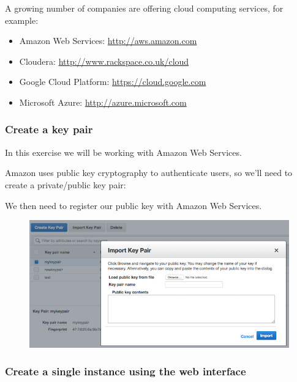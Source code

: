 A growing number of companies are offering cloud computing services, for
example:

\begin{itemize}
\itemsep1pt\parskip0pt
\item
  Amazon Web Services: \url{http://aws.amazon.com}
\item
  Cloudera: \url{http://www.rackspace.co.uk/cloud}
\item
  Google Cloud Platform: \url{https://cloud.google.com}
\item
  Microsoft Azure: \url{http://azure.microsoft.com}
\end{itemize}

\subsubsection{Create a key pair}\label{create-a-key-pair}

In this exercise we will be working with Amazon Web Services.

Amazon uses public key cryptography to authenticate users, so we'll need
to create a private/public key pair:

\begin{Shaded}
\begin{Highlighting}[]
\NormalTok{$ } 
\end{Highlighting}
\end{Shaded}

We then need to register our public key with Amazon Web Services.

\begin{figure}[htbp]
\centering
\includegraphics{96Cloud/figures/key_pair.png}
\end{figure}

\subsubsection{Create a single instance using the web
interface}\label{create-a-single-instance-using-the-web-interface}


